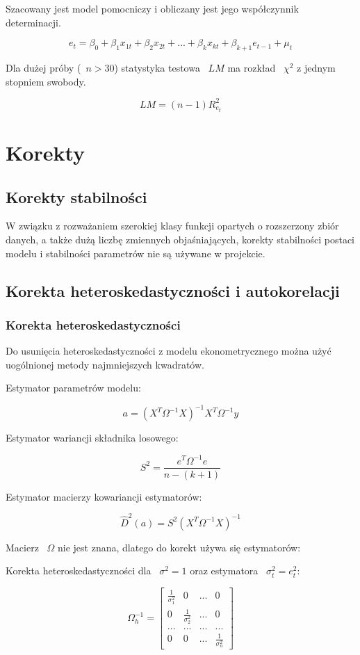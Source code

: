 \documentclass{article}
\begin{document}
Szacowany jest model pomocniczy i obliczany jest jego współczynnik determinacji.

\[e_t=\beta_0+\beta_1x_{1t}+\beta_2x_{2t}+...+\beta_kx_{kt}+\beta_{k+1}e_{t-1}+\mu_t\]

Dla dużej próby (~$n>30$) statystyka testowa ~$LM$ ma rozkład ~$\chi^2$ z jednym stopniem swobody.

\[LM = (n-1)R_{e_t}^2\]

\newpage
\section{Korekty}

\subsection{Korekty stabilności}
W związku z rozważaniem szerokiej klasy funkcji opartych o rozszerzony zbiór danych, a także dużą liczbę zmiennych objaśniających, korekty stabilności postaci modelu i stabilności parametrów nie są używane w projekcie.

\subsection{Korekta heteroskedastyczności i autokorelacji}

\subsubsection{Korekta heteroskedastyczności}
Do usunięcia heteroskedastyczności z modelu ekonometrycznego można użyć uogólnionej metody najmniejszych kwadratów.

Estymator parametrów modelu:

\[a = (X^T\Omega^{-1}X)^{-1}X^T\Omega^{-1}y\]

Estymator wariancji składnika losowego:

\[S^2=\frac{e^T\Omega^{-1}e}{n - (k+1)}\]

Estymator macierzy kowariancji estymatorów:

\[\hat{D}^2(a)=S^2(X^T\Omega^{-1}X)^{-1}\]

Macierz ~$\Omega$ nie jest znana, dlatego do korekt używa się estymatorów:

Korekta heteroskedastyczności dla ~$\sigma^2 = 1$ oraz estymatora ~$\sigma_t^2=e_t^2$:

\begin{equation*}
    \Omega_{h}^{-1}=
    \begin{bmatrix}
        \frac{1}{\sigma_1^2} & 0 & ... & 0 \\
        0 & \frac{1}{\sigma_2^2} & ... & 0 \\
        ... & ... & ... & ... \\
        0 & 0 & ... & \frac{1}{\sigma_n^2}
    \end{bmatrix}
\end{equation*}
\end{document}
